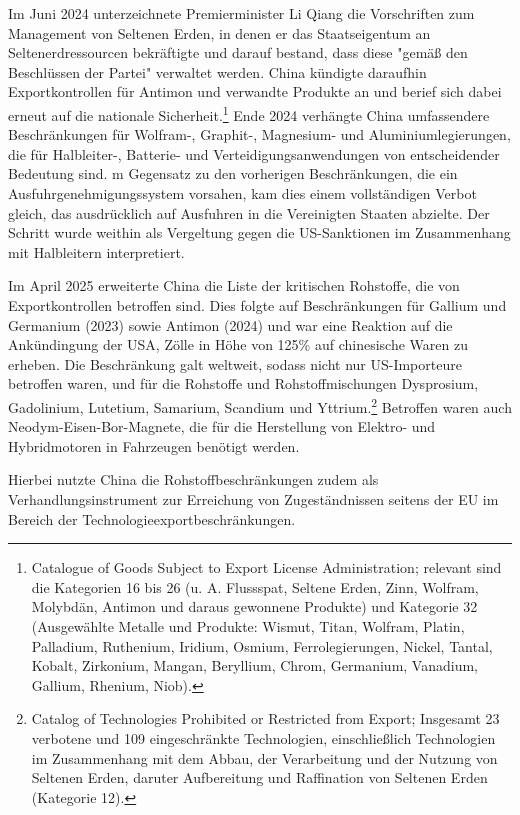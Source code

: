 \documentclass[12pt,a4paper,oneside]{book} %
\begin{document}
Im Juni 2024 unterzeichnete Premierminister Li Qiang die Vorschriften zum Management von Seltenen Erden, in denen er das Staatseigentum an Seltenerdressourcen bekräftigte und darauf bestand, dass diese "gemäß den Beschlüssen der Partei" verwaltet werden. China kündigte daraufhin Exportkontrollen für Antimon und verwandte Produkte an und berief sich dabei erneut auf die nationale Sicherheit.\footnote{Catalogue of Goods Subject to Export License Administration; relevant sind die Kategorien 16 bis 26 (u. A. Flussspat, Seltene Erden, Zinn, Wolfram, Molybdän, Antimon und daraus gewonnene Produkte) und Kategorie 32 (Ausgewählte Metalle und Produkte: Wismut, Titan, Wolfram, Platin, Palladium, Ruthenium, Iridium, Osmium, Ferrolegierungen, Nickel, Tantal, Kobalt, Zirkonium, Mangan, Beryllium, Chrom, Germanium, Vanadium, Gallium, Rhenium, Niob).} Ende 2024 verhängte China umfassendere Beschränkungen für Wolfram-, Graphit-, Magnesium- und Aluminiumlegierungen, die für Halbleiter-, Batterie- und Verteidigungsanwendungen von entscheidender Bedeutung sind. m Gegensatz zu den vorherigen Beschränkungen, die ein Ausfuhrgenehmigungssystem vorsahen, kam dies einem vollständigen Verbot gleich, das ausdrücklich auf Ausfuhren in die Vereinigten Staaten abzielte. Der Schritt wurde weithin als Vergeltung gegen die US-Sanktionen im Zusammenhang mit Halbleitern interpretiert.

Im April 2025 erweiterte China die Liste der kritischen Rohstoffe, die von Exportkontrollen betroffen sind.\autocite{https://www.reuters.com/world/china/chinas-export-controls-are-curbing-critical-mineral-shipments-world-2025-04-20/} Dies folgte auf Beschränkungen für Gallium und Germanium (2023) sowie Antimon (2024) und war eine Reaktion auf die Ankündingung der USA, Zölle in Höhe von 125\% auf chinesische Waren zu erheben. Die Beschränkung galt weltweit, sodass nicht nur US-Importeure betroffen waren, und für die Rohstoffe und Rohstoffmischungen Dysprosium, Gadolinium, Lutetium, Samarium, Scandium und Yttrium.\footnote{Catalog of Technologies Prohibited or Restricted from Export; Insgesamt 23 verbotene und 109 eingeschränkte Technologien, einschließlich Technologien im Zusammenhang mit dem Abbau, der Verarbeitung und der Nutzung von Seltenen Erden, daruter Aufbereitung und Raffination von Seltenen Erden (Kategorie 12).} Betroffen waren auch Neodym-Eisen-Bor-Magnete, die für die Herstellung von Elektro- und Hybridmotoren in Fahrzeugen benötigt werden.

Hierbei nutzte China die Rohstoffbeschränkungen zudem als Verhandlungsinstrument zur Erreichung von Zugeständnissen seitens der EU im Bereich der Technologieexportbeschränkungen.\autocite{Rohstoffe als Verhandlungswaffe}
\end{document}
